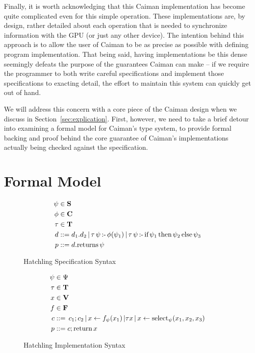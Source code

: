 Finally, it is worth acknowledging that this Caiman implementation has become quite complicated even for this simple operation.  These implementations are, by design, rather detailed about each operation that is needed to synchronize information with the GPU (or just any other device).  The intention behind this approach is to allow the user of Caiman to be as precise as possible with defining program implementation.  That being said, having implementations be this dense seemingly defeats the purpose of the guarantees Caiman can make -- if we require the programmer to both write careful specifications and implement those specifications to exacting detail, the effort to maintain this system can quickly get out of hand.

We will address this concern with a core piece of the Caiman design when we discuss in Section~\ref{sec:explication}.  First, however, we need to take a brief detour into examining a formal model for Caiman's type system, to provide formal backing and proof behind the core guarantee of Caiman's implementations actually being checked against the specification.

\section{Formal Model}
\label{sec:formal}

\begin{figure}
\begin{align*}
	\psi &\in \textbf{S}\\
	\phi &\in \textbf{C}\\
	\tau &\in \textbf{T} \\
    d &\mathrel{::=} d_1.d_2 \,|\,
        \tau\,\psi\,\textrm{:-}\, \phi(\psi_1) \,|\,
        \tau\,\psi\,\textrm{:-}\, \textrm{if}\, \psi_1 \,\textrm{then}\, \psi_2 \,\textrm{else}\, \psi_3 
        \\
    p &\mathrel{::=} d.\textrm{returns}\, \psi
\end{align*}
\caption{Hatchling Specification Syntax}
\label{fig:hatchspecsyntax}
\end{figure}

\begin{figure}
\begin{align*}
	\psi&\in \Psi\\
   	\tau&\in \textbf{T} \\
	x&\in \textbf{V}\\
	f&\in \textbf{F}\\
	c&\mathrel{::=} \,c_1 ; c_2 \,|\, 
        x\leftarrow f_\psi(x_1) \,| \tau x \,|\, x\leftarrow\textrm{select}_{\psi} (x_1, x_2, x_3)\\
    p&\mathrel{::=} c;\textrm{return}\, x
\end{align*}
\caption{Hatchling Implementation Syntax}
\label{fig:hatchimplsyntax}
\end{figure}

